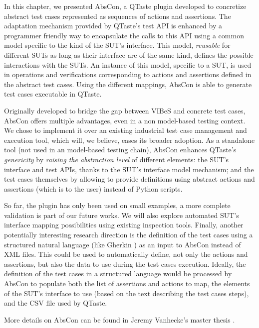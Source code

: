 \label{sec:abscon:conclusion}

In this chapter, we presented \gls{AbsCon}, a QTaste plugin developed to concretize abstract test cases represented as sequences of actions and assertions. The adaptation mechanism provided by QTaste's test API is enhanced by a programmer friendly way to encapsulate the calls to this API using a common model specific to the kind of the SUT's interface. This model, \emph{reusable} for different SUTs as long as their interface are of the same kind, defines the possible interactions with the SUTs. An instance of this model, specific to a SUT, is used in operations and verifications corresponding to actions and assertions defined in the abstract test cases. Using the different mappings, AbsCon is able to generate test cases executable in QTaste.

Originally developed to bridge the gap between VIBeS and concrete test cases, AbsCon offers multiple advantages, even in a non model-based testing context. We chose to implement it over an existing industrial test case management and execution tool, which will, we believe, eases its broader adoption. As a standalone tool (\ie not used in an model-based testing chain), AbsCon enhances QTaste's \emph{genericity} by \emph{raising the abstraction level} of different elements: the SUT's interface and test APIs, thanks to the SUT's interface model mechanism; and the test cases themselves by allowing to provide definitions using abstract actions and assertions (which is  to the user) instead of Python scripts. 

So far, the plugin has only been used on small examples, a more complete validation is part of our future works. We will also explore automated SUT's interface mapping possibilities using existing inspection tools. Finally, another potentially interesting research direction is the definition of the test cases using a structured natural language (like Gherkin \cite{cucumber}) as an input to AbsCon instead of XML files. 
This could be used to automatically define, not only the actions and assertions, but also the data to use during the test cases execution. Ideally, the definition of the test cases in a structured language would be processed by AbsCon to populate both the list of assertions and actions to map, the elements of the SUT's interface to use (based on the text describing the test cases steps), and the CSV file used by QTaste. 

More details on \gls{AbsCon} can be found in Jeremy Vanhecke's master thesis \cite{Vanhecke2016}.

